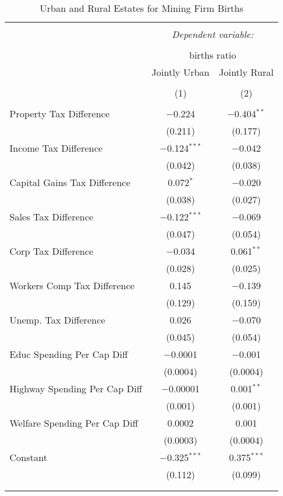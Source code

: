 
\begin{table}[!htbp] \centering 
  \caption{Urban and Rural Estates for  Mining Firm Births} 
  \label{} 
\begin{tabular}{@{\extracolsep{5pt}}lcc} 
\\[-1.8ex]\hline 
\hline \\[-1.8ex] 
 & \multicolumn{2}{c}{\textit{Dependent variable:}} \\ 
\cline{2-3} 
\\[-1.8ex] & \multicolumn{2}{c}{births ratio} \\ 
 & Jointly Urban & Jointly Rural \\ 
\\[-1.8ex] & (1) & (2)\\ 
\hline \\[-1.8ex] 
 Property Tax Difference & $-$0.224 & $-$0.404$^{**}$ \\ 
  & (0.211) & (0.177) \\ 
  Income Tax Difference & $-$0.124$^{***}$ & $-$0.042 \\ 
  & (0.042) & (0.038) \\ 
  Capital Gains Tax Difference & 0.072$^{*}$ & $-$0.020 \\ 
  & (0.038) & (0.027) \\ 
  Sales Tax Difference & $-$0.122$^{***}$ & $-$0.069 \\ 
  & (0.047) & (0.054) \\ 
  Corp Tax Difference & $-$0.034 & 0.061$^{**}$ \\ 
  & (0.028) & (0.025) \\ 
  Workers Comp Tax Difference & 0.145 & $-$0.139 \\ 
  & (0.129) & (0.159) \\ 
  Unemp. Tax Difference & 0.026 & $-$0.070 \\ 
  & (0.045) & (0.054) \\ 
  Educ Spending Per Cap Diff & $-$0.0001 & $-$0.001 \\ 
  & (0.0004) & (0.0004) \\ 
  Highway Spending Per Cap Diff & $-$0.00001 & 0.001$^{**}$ \\ 
  & (0.001) & (0.001) \\ 
  Welfare Spending Per Cap Diff & 0.0002 & 0.001 \\ 
  & (0.0003) & (0.0004) \\ 
  Constant & $-$0.325$^{***}$ & 0.375$^{***}$ \\ 
  & (0.112) & (0.099) \\ 
 \hline \\[-1.8ex] 
\hline 
\hline \\[-1.8ex] 
\end{tabular} 
\end{table} 
